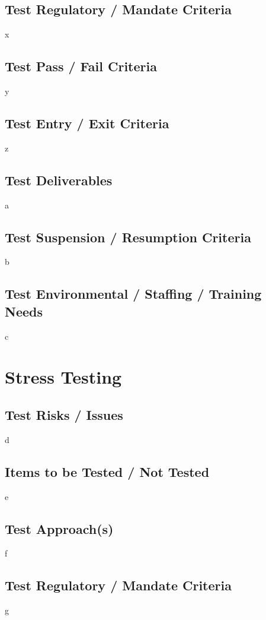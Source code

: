 \documentclass{article}
\begin{document}
\subsection{Test Regulatory / Mandate Criteria}
x

\subsection{Test Pass / Fail Criteria}
y

\subsection{Test Entry / Exit Criteria}
z

\subsection{Test Deliverables}
a

\subsection{Test Suspension / Resumption Criteria}
b

\subsection{Test Environmental / Staffing / Training Needs}
c

\section{Stress Testing}
\subsection{Test Risks / Issues}
d

\subsection{Items to be Tested / Not Tested}
e

\subsection{Test Approach(s)}
f

\subsection{Test Regulatory / Mandate Criteria}
g
\end{document}
